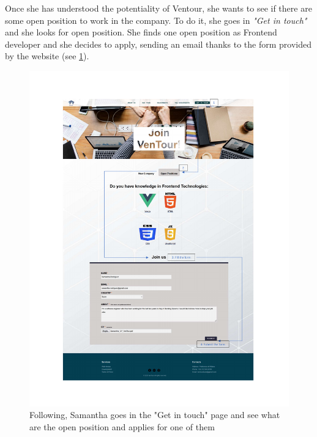 \documentclass[../../DD.tex]{subfiles}
\begin{document}
        Once she has understood the potentiality of Ventour, she wants to see if there are some open position to work in the company. To do it, she goes in \textit{"Get in touch"} and she looks for open position. 
        She finds one open position as Frontend developer and she decides to apply, sending an email thanks to the form provided by the website (see \ref{fig: UC02}).

        \begin{figure}[!htb]
            \centering
            \includegraphics[width=\textwidth]{Images/scenarios/UseCase 2.pdf}
            \caption{Following, Samantha goes in the "Get in touch" page and see what are the open position and applies for one of them}
            \label{fig: UC02}
        \end{figure}

\clearpage
\end{document}
